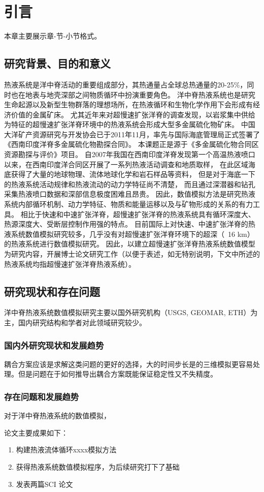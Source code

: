 
\chapter{引言}
\label{chapter:Introduction}

本章主要展示章-节-小节格式。

\section{研究背景、目的和意义}
热液系统是洋中脊活动的重要组成部分，其热通量占全球总热通量的20-25\%，同时也在地表与地壳深部之间物质循环中扮演重要角色。
洋中脊热液系统也是研究生命起源以及新型生物群落的理想场所，在热液循环和生物化学作用下会形成有经济价值的金属矿床。
尤其近年来对超慢速扩张洋脊的调查发现，以岩浆集中供给为特征的超慢速扩张洋脊环境中的热液系统会形成大型多金属硫化物矿床。
中国大洋矿产资源研究与开发协会已于2011年11月，率先与国际海底管理局正式签署了《西南印度洋脊多金属硫化物勘探合同》。
本课题正是源于《多金属硫化物合同区资源勘探与评价》项目。
自2007年我国在西南印度洋脊发现第一个高温热液喷口以来，在西南印度洋合同区开展了一系列热液活动调查和地质取样，
在此区域海底获得了大量的地球物理、流体地球化学和岩石样品等资料，
但是对于海底一下的热液系统活动规律和热液流动的动力学特征尚不清楚，
而且通过深潜器和钻孔采集热液喷口数据和深部信息极度困难且昂贵。
因此，数值模拟方法是研究热液系统内部循环机制、动力学特征、物质和能量运移以及与矿物形成的关系的有力工具。
相比于快速和中速扩张洋脊，超慢速扩张洋脊的热液系统具有循环深度大、热源深度大、受断层控制作用强的特点。
目前国际上对快速、中速扩张洋脊的热液系统数值模拟研究较多，几乎没有对超慢速扩张洋脊环境下的超深（~16 km）的热液系统进行数值模拟研究。
因此，以建立超慢速扩张洋脊热液系统数值模型为研究内容，开展博士论文研究工作（以便于表述，如无特别说明，下文中所述的热液系统均指超慢速扩张洋脊热液系统）。


\section{研究现状和存在问题}
洋中脊热液系统数值模拟研究主要以国外研究机构（USGS, GEOMAR, ETH）为主，国内研究结构和学者对此领域研究较少。

\subsection{国内外研究现状和发展趋势}


耦合方案应该是求解这类问题的更好的选择，大的时间步长是的三维模拟更容易处理。但是问题在于如何推导出耦合方案既能保证稳定性又不失精度。

\subsection{存在问题和发展趋势}
对于洋中脊热液系统的数值模拟，


论文主要成果如下：

\begin{enumerate}
	\item 构建热液流体循环xxxx模拟方法
	\item 获得热液系统数值模拟程序，为后续研究打下了基础
	\item 发表两篇SCI 论文
\end{enumerate}


